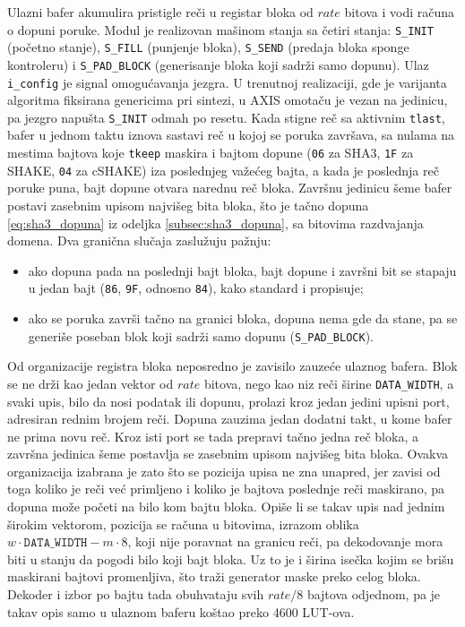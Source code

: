 Ulazni bafer akumulira pristigle reči u registar bloka od $rate$ bitova i vodi računa o dopuni poruke. Modul je realizovan mašinom stanja sa četiri stanja: \texttt{S\_INIT} (početno stanje), \texttt{S\_FILL} (punjenje bloka), \texttt{S\_SEND} (predaja bloka sponge kontroleru) i \texttt{S\_PAD\_BLOCK} (generisanje bloka koji sadrži samo dopunu). Ulaz \texttt{i\_config} je signal omogućavanja jezgra. U trenutnoj realizaciji, gde je varijanta algoritma fiksirana genericima pri sintezi, u AXIS omotaču je vezan na jedinicu, pa jezgro napušta \texttt{S\_INIT} odmah po resetu. Kada stigne reč sa aktivnim \texttt{tlast}, bafer u jednom taktu iznova sastavi reč u kojoj se poruka završava, sa nulama na mestima bajtova koje \texttt{tkeep} maskira i bajtom dopune (\texttt{06} za SHA3, \texttt{1F} za SHAKE, \texttt{04} za cSHAKE) iza poslednjeg važećeg bajta, a kada je poslednja reč poruke puna, bajt dopune otvara narednu reč bloka. Završnu jedinicu šeme bafer postavi zasebnim upisom najvišeg bita bloka, što je tačno dopuna \eqref{eq:sha3_dopuna} iz odeljka \ref{subsec:sha3_dopuna}, sa bitovima razdvajanja domena. Dva granična slučaja zaslužuju pažnju:
\begin{itemize}[itemsep=2pt]
    \item ako dopuna pada na poslednji bajt bloka, bajt dopune i završni bit se stapaju u jedan bajt (\texttt{86}, \texttt{9F}, odnosno \texttt{84}), kako standard i propisuje;
    \item ako se poruka završi tačno na granici bloka, dopuna nema gde da stane, pa se generiše poseban blok koji sadrži samo dopunu (\texttt{S\_PAD\_BLOCK}).
\end{itemize}
\smallbreak
Od organizacije registra bloka neposredno je zavisilo zauzeće ulaznog bafera. Blok se ne drži kao jedan vektor od $rate$ bitova, nego kao niz reči širine \texttt{DATA\_WIDTH}, a svaki upis, bilo da nosi podatak ili dopunu, prolazi kroz jedan jedini upisni port, adresiran rednim brojem reči. Dopuna zauzima jedan dodatni takt, u kome bafer ne prima novu reč. Kroz isti port se tada prepravi tačno jedna reč bloka, a završna jedinica šeme postavlja se zasebnim upisom najvišeg bita bloka. Ovakva organizacija izabrana je zato što se pozicija upisa ne zna unapred, jer zavisi od toga koliko je reči već primljeno i koliko je bajtova poslednje reči maskirano, pa dopuna može početi na bilo kom bajtu bloka.
\smallbreak
Opiše li se takav upis nad jednim širokim vektorom, pozicija se računa u bitovima, izrazom oblika $w \cdot \texttt{DATA\_WIDTH} - m \cdot 8$, koji nije poravnat na granicu reči, pa dekodovanje mora biti u stanju da pogodi bilo koji bajt bloka. Uz to je i širina isečka kojim se brišu maskirani bajtovi promenljiva, što traži generator maske preko celog bloka. Dekoder i izbor po bajtu tada obuhvataju svih $rate/8$ bajtova odjednom, pa je takav opis samo u ulaznom baferu koštao preko 4600 LUT-ova.
